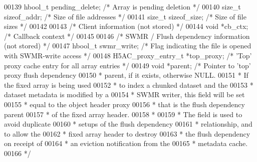 \begin{DoxyCode}
00139     hbool\_t pending\_delete;             \textcolor{comment}{/* Array is pending deletion                                    */}
00140     \textcolor{keywordtype}{size\_t} sizeof\_addr;                 \textcolor{comment}{/* Size of file addresses                                       */}
00141     \textcolor{keywordtype}{size\_t} sizeof\_size;                 \textcolor{comment}{/* Size of file sizes                                           */}
00142 
00143     \textcolor{comment}{/* Client information (not stored) */}
00144     \textcolor{keywordtype}{void} *cb\_ctx;                       \textcolor{comment}{/* Callback context */}
00145 
00146     \textcolor{comment}{/* SWMR / Flush dependency information (not stored) */}
00147     hbool\_t swmr\_write;                 \textcolor{comment}{/* Flag indicating the file is opened with SWMR-write access    */}
00148     H5AC\_proxy\_entry\_t *top\_proxy;      \textcolor{comment}{/* 'Top' proxy cache entry for all array entries */}
00149     \textcolor{keywordtype}{void} *parent;               \textcolor{comment}{/* Pointer to 'top' proxy flush dependency}
00150 \textcolor{comment}{                                         * parent, if it exists, otherwise NULL.}
00151 \textcolor{comment}{                                         * If the fixed array is being used}
00152 \textcolor{comment}{                                         * to index a chunked dataset and the}
00153 \textcolor{comment}{                                         * dataset metadata is modified by a}
00154 \textcolor{comment}{                                         * SWMR writer, this field will be set}
00155 \textcolor{comment}{                                         * equal to the object header proxy}
00156 \textcolor{comment}{                                         * that is the flush dependency parent}
00157 \textcolor{comment}{                                         * of the fixed array header.}
00158 \textcolor{comment}{                     *}
00159 \textcolor{comment}{                     * The field is used to avoid duplicate}
00160 \textcolor{comment}{                     * setups of the flush dependency }
00161 \textcolor{comment}{                     * relationship, and to allow the }
00162 \textcolor{comment}{                     * fixed array header to destroy}
00163 \textcolor{comment}{                     * the flush dependency on receipt of }
00164 \textcolor{comment}{                     * an eviction notification from the}
00165 \textcolor{comment}{                     * metadata cache.}
00166 \textcolor{comment}{                     */}

\end{DoxyCode}
